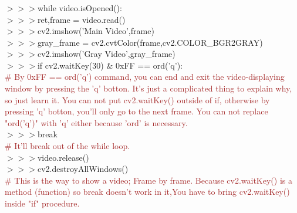 \documentclass[a4paper,18pt]{article}
\begin{document}
{{{{{%

\subsubsection{\colorbox {important}{\color{white}{\large How to display a video}}}

\hspace*{14pt}$>>>$while video.isOpened():\\
\hspace*{14pt}$>>>$\hspace*{28pt}ret,frame = video.read()\\
\hspace*{14pt}$>>>$\hspace*{28pt}cv2.imshow('Main Video',frame)\\
\hspace*{14pt}$>>>$\hspace*{28pt}gray\_frame = cv2.cvtColor(frame,cv2.COLOR\_BGR2GRAY)\\
\hspace*{14pt}$>>>$\hspace*{28pt}cv2.imshow('Gray Video',gray\_frame)\\
\hspace*{14pt}$>>>$\hspace*{28pt}if cv2.waitKey(30) \& 0xFF == ord('q'):\\{\textcolor{brown}{\# By 0xFF == ord('q') command, you can end and exit the video-displaying window by pressing the 'q' botton. It's just a complicated thing to explain why, so just learn it. You can not put cv2.waitKey() outside of if, otherwise by pressing 'q' botton, you'll only go to the next frame. You can not replace "ord('q')" with 'q' either because 'ord' is necessary.}}\\
\hspace*{14pt}$>>>$\hspace*{42pt}break\\{\textcolor{brown}{\# It'll break out of the while loop.}}\\
\hspace*{14pt}$>>>$video.release()\\
\hspace*{14pt}$>>>$cv2.destroyAllWindows()\\{\textcolor{brown}{\# This is the way to show a video; Frame by frame. Because cv2.waitKey() is a method (function) so break doesn't work in it,You have to bring cv2.waitKey() inside "if" procedure. }}\\

}}}}}
\end{document}
